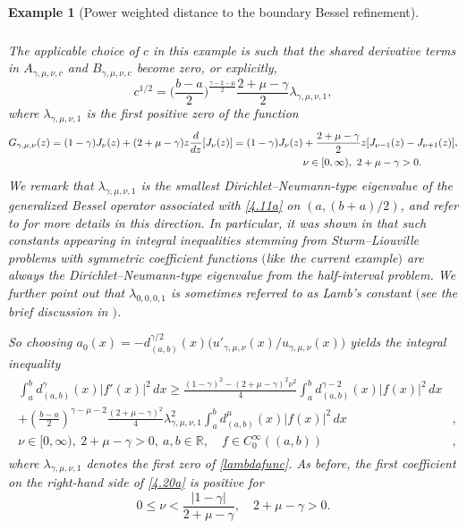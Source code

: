 \documentclass[reqno,10pt,centertags]{amsart}
\newcommand{\bbR}{{\mathbb{R}}}
\newcommand{\g}{\gamma}
\numberwithin{equation}{section}
\newtheorem{example}[theorem]{Example}
\theoremstyle{remark}
\begin{document}
\begin{example}[Power weighted distance to the boundary Bessel refinement]
\begin{align}
\begin{split}
\end{split}
\end{align}
The applicable choice of $c$ in this example is such that the shared derivative terms in $A_{\g,\mu,\nu,c}$ and $B_{\g,\mu,\nu,c}$ become zero, or explicitly,
\begin{equation}\label{4.32}
c^{1/2}=\bigg(\frac{b-a}{2}\bigg)^{\frac{\g-2-\mu}{2}}\dfrac{2+\mu-\g}{2}\lambda_{\g,\mu,\nu,1},
\end{equation}
where $\lambda_{\g,\mu,\nu,1}$ is the first positive zero of the function
\begin{align}\label{lambdafunc}
G_{\g,\mu,\nu}(z)=(1-\g) J_\nu(z)+(2+\mu-\g)z \frac{d}{dz}[J_\nu(z)]=(1-\g) J_\nu(z)&+\frac{2+\mu-\g}{2}z[J_{\nu-1}(z)-J_{\nu+1}(z)], \notag\\
&\nu\in[0,\infty),\ 2+\mu-\gamma>0.
\end{align}
We remark that $\lambda_{\g,\mu,\nu,1}$ is the smallest Dirichlet--Neumann-type eigenvalue of the generalized Bessel operator associated with \eqref{4.11a} on $(a,(b+a)/2)$, and refer to \cite{FS25} for more details in this direction. In particular, it was shown in \cite[Sect. 5.1]{FS25} that such constants appearing in  integral inequalities stemming from Sturm--Liouville problems with symmetric coefficient functions $($like the current example$)$ are always the Dirichlet--Neumann-type eigenvalue from the half-interval problem. We further point out that $\lambda_{0,0,0,1}$ is sometimes referred to as Lamb's constant $($see the brief discussion in \cite{AW07}$)$.

So choosing $a_0(x)=-d^{\g/2}_{(a,b)}(x)\big(u'_{\g,\mu,\nu}(x)/u_{\g,\mu,\nu}(x)\big)$ yields the integral inequality
\begin{align}\label{4.20a}
\begin{split}
\int_a^b d_{(a,b)}^\g(x) |f'(x)|^2\, dx  \geq \frac{(1-\g)^2-(2+\mu-\g)^2\nu^2}{4}\int_a^b d_{(a,b)}^{\g-2}(x)|f(x)|^2\, dx &\\
+\left(\frac{b-a}{2}\right)^{\g-\mu-2}\frac{(2+\mu-\g)^2}{4}\lambda_{\g,\mu,\nu,1}^2\int_a^b d_{(a,b)}^\mu(x) |f(x)|^2\, dx&,  \\
\nu\in[0,\infty),\ 2+\mu-\g>0,\ a,b\in\bbR,\quad f\in C^\infty_0((a,b))&,
\end{split}
\end{align}
where $\lambda_{\g,\mu,\nu,1}$ denotes the first zero of \eqref{lambdafunc}.
As before, the first coefficient on the right-hand side of \eqref{4.20a} is positive for
\begin{equation}
0\leq\nu< \frac{|1-\g|}{2+\mu-\g},\quad 2+\mu-\g>0.
\end{equation}
\end{example}
\end{document}
